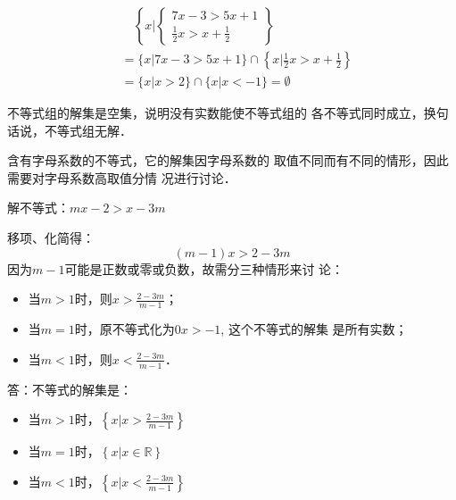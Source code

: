 \begin{solution}
 \[\begin{split}
&  \quad \left\{x\Big|\begin{cases}
    7x-3>5x+1\\
    \frac{1}{2}x>x+\frac{1}{2}
\end{cases} \right\}   \\
&=\{x|7x-3>5x+1 \}\cap\left\{x|\frac{1}{2}x>x+\frac{1}{2}\right\}\\
&=\{x|x>2\}\cap\{x|x<-1\}=\emptyset
 \end{split}\]  
\begin{figure}[htp]
    \centering
{}
    \caption{}
\end{figure}

 不等式组的解集是空集，说明没有实数能使不等式组的
各不等式同时成立，换句话说，不等式组无解．
\end{solution}

\begin{rmk}
    含有字母系数的不等式，它的解集因字母系数的
取值不同而有不同的情形，因此需要对字母系数高取值分情
况进行讨论．
\end{rmk}

\begin{example}
    解不等式：$mx-2>x-3m$
\end{example}

\begin{solution}
移项、化简得：
\[(m-1)x>2-3m\]
因为$m-1$可能是正数或零或负数，故需分三种情形来讨
论：
\begin{itemize}
    \item 当$m>1$时，则$x>\frac{2-3m}{m-1}$；
\item 当$m=1$时，原不等式化为$0x>-1$, 这个不等式的解集
是所有实数；
\item 当$m<1$时，则$x<\frac{2-3m}{m-1}$．
\end{itemize}

答：不等式的解集是：
\begin{itemize}
    \item 当$m>1$时，$\left\{x\Big| x>\frac{2-3m}{m-1}\right\}$
    \item 当$m=1$时，$\left\{x\Big| x\in\mathbb{R}\right\}$
    \item 当$m<1$时，$\left\{x\Big| x<\frac{2-3m}{m-1}\right\}$
\end{itemize}
\end{solution}

